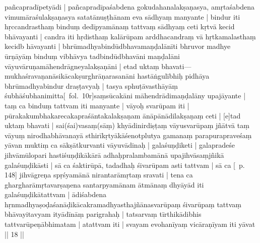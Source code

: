 \documentclass[12pt]{article}
\newcommand{\emdash} {\hspace{0em}—\hspace{0em}}
\begin{document}
pañcapradīpetyādi | pañcapradīpaśabdena gokudahanalakṣaṇasya, amṛtaśabdena vimumāraśulakṣaṇasya satatānuṣṭhānam eva sādhyaṃ manyante | bindur iti hṛccandrasthaṃ binduṃ dedīpyamānaṃ tattvaṃ sādhyaṃ ceti kṛtvā kecid bhāvayanti | candra iti hṛdisthaṃ kalārūpam arddhacandraṃ vā hṛtkamalasthaṃ kecidb hāvayanti | bhrūmadhyabindūdbhavamaṇḍalānīti bhruvor madhye ūrṇāyāṃ binduṃ vibhāvya tadbindūdbhavāni maṇḍalāni vāyuvāruṇamāhendrāgneyalakṣaṇāni | etad uktaṃ bhavati\emdash mukhaśravaṇanāsikācakṣurghrāṇarasanāni hastāṅgulībhiḥ pidhāya bhrūmadhyabindur draṣṭavyaḥ | tasya sphuṭāvasthāyāṃ śubhāśubhanimitta[\MS\ fol.\ 10r]saṃsūcakāni māhendrādimaṇḍalāny upajāyante | taṃ ca binduṃ tattvam iti manyante | vāyoḥ svarūpam iti | pūrakakumbhakarecakapraśāntakalakṣaṇam ānāpānādilakṣaṇaṃ ceti | [e]tad uktaṃ bhavati | sai(śai)vasaṃ(sāṃ) khyādinirdiṣṭaṃ vāyusvarūpaṃ jñātvā taṃ vāyuṃ nirodhabhāvanayā sthirīkṛtyākāśenotplutya gamanaṃ parapurapraveśaṃ yāvan muktiṃ ca sākṣātkurvanti vāyuvādinaḥ | galaśuṇḍiketi | galapradeśe jihvāmūlopari hastiśuṇḍikākārā adhaḥpralambamānā upajihvāsaṃjñikā galaśuṇḍikāsti | sā ca śaktirūpā, tadadhaḥ śivarūpam asti tattvam | sā ca [\EDD\ p. 148] jihvāgreṇa spṛśyamānā nirantarāmṛtaṃ sravati | tena ca ghargharāmṛtavarṣaṇena santarpyamānam ātmānaṃ dhyāyād iti galaśuṇḍikātattvam | ādiśabdena hṛnmadhyaṣoḍaśanāḍikācakramadhyasthajñānasvarūpaṃ śivarūpaṃ tattvaṃ bhāvayitavyam ityādīnāṃ parigrahaḥ | tatsarvaṃ tīrthikādibhis tattvarūpeṇābhimatam | atattvam iti | svayam evohanīyaṃ vicāraṇīyam iti yāvat || 18 ||\\
\end{document}
